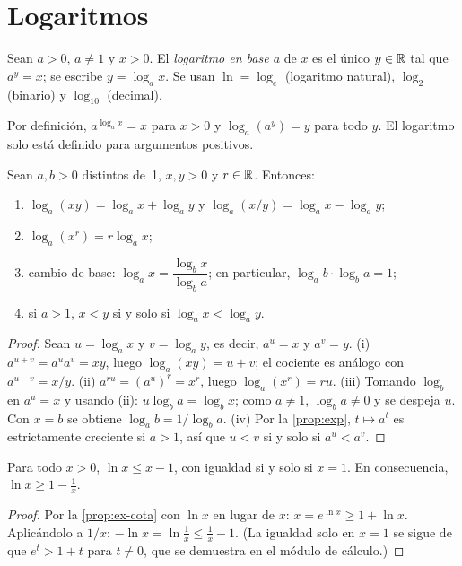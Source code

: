 \section{Logaritmos}

\begin{definicion}[Logaritmo]\label{def:log}
Sean $a>0$, $a\neq1$ y $x>0$. El \emph{logaritmo en base $a$} de $x$ es el único $y\in\mathbb{R}$ tal que $a^y=x$; se escribe $y=\log_ax$. Se usan $\ln=\log_e$ (logaritmo natural), $\log_2$ (binario) y $\log_{10}$ (decimal).
\end{definicion}

Por definición, $a^{\log_ax}=x$ para $x>0$ y $\log_a(a^y)=y$ para todo $y$. El logaritmo solo está definido para argumentos positivos.

\begin{teorema}\label{teo:log}
Sean $a,b>0$ distintos de~1, $x,y>0$ y $r\in\mathbb{R}$. Entonces:
\begin{enumerate}
  \item $\log_a(xy)=\log_ax+\log_ay$ y $\log_a(x/y)=\log_ax-\log_ay$;
  \item $\log_a(x^r)=r\log_ax$;
  \item cambio de base: $\log_ax=\dfrac{\log_bx}{\log_ba}$; en particular, $\log_ab\cdot\log_ba=1$;
  \item si $a>1$, $x<y$ si y solo si $\log_ax<\log_ay$.
\end{enumerate}
\end{teorema}

\begin{proof}
Sean $u=\log_ax$ y $v=\log_ay$, es decir, $a^u=x$ y $a^v=y$. (i) $a^{u+v}=a^ua^v=xy$, luego $\log_a(xy)=u+v$; el cociente es análogo con $a^{u-v}=x/y$. (ii) $a^{ru}=(a^u)^r=x^r$, luego $\log_a(x^r)=ru$. (iii) Tomando $\log_b$ en $a^u=x$ y usando (ii): $u\log_ba=\log_bx$; como $a\neq1$, $\log_ba\neq0$ y se despeja $u$. Con $x=b$ se obtiene $\log_ab=1/\log_ba$. (iv) Por la \cref{prop:exp}, $t\mapsto a^t$ es estrictamente creciente si $a>1$, así que $u<v$ si y solo si $a^u<a^v$.
\end{proof}

\begin{corolario}\label{cor:lnx}
Para todo $x>0$, $\ln x\le x-1$, con igualdad si y solo si $x=1$. En consecuencia, $\ln x\ge1-\frac1x$.
\end{corolario}

\begin{proof}
Por la \cref{prop:ex-cota} con $\ln x$ en lugar de $x$: $x=e^{\ln x}\ge1+\ln x$. Aplicándolo a $1/x$: $-\ln x=\ln\frac1x\le\frac1x-1$. (La igualdad solo en $x=1$ se sigue de que $e^t>1+t$ para $t\neq0$, que se demuestra en el módulo de cálculo.)
\end{proof}

